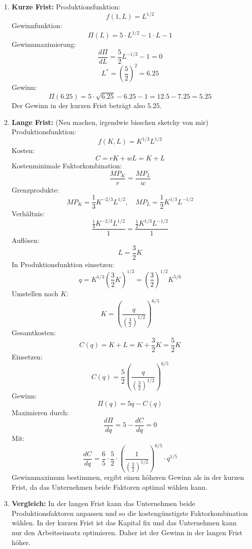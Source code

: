 \begin{solution}
	\begin{enumerate}
		\item \textbf{Kurze Frist:}
		      Produktionsfunktion:
		      \[
			      f(1, L) = L^{1/2}
		      \]
		      Gewinnfunktion:
		      \[
			      \Pi(L) = 5 \cdot L^{1/2} - 1 \cdot L - 1
		      \]
		      Gewinnmaximierung:
		      \[
			      \frac{d\Pi}{dL} = \frac{5}{2} L^{-1/2} - 1 = 0
		      \]
		      \[
			      L^* = \left(\frac{5}{2}\right)^2 = 6.25
		      \]
		      Gewinn:
		      \[
			      \Pi(6.25) = 5 \cdot \sqrt{6.25} - 6.25 - 1 = 12.5 - 7.25 = 5.25
		      \]
		      Der Gewinn in der kurzen Frist beträgt also \(\boxed{5.25}\).

		\item \textbf{Lange Frist:} (Neu machen, irgendwie bisschen sketchy von mir)
		      Produktionsfunktion:
		      \[
			      f(K, L) = K^{1/3} L^{1/2}
		      \]
		      Kosten:
		      \[
			      C = rK + wL = K + L
		      \]
		      Kostenminimale Faktorkombination:
		      \[
			      \frac{MP_K}{r} = \frac{MP_L}{w}
		      \]
		      Grenzprodukte:
		      \[
			      MP_K = \frac{1}{3} K^{-2/3} L^{1/2}, \quad MP_L = \frac{1}{2} K^{1/3} L^{-1/2}
		      \]
		      Verhältnis:
		      \[
			      \frac{\frac{1}{3} K^{-2/3} L^{1/2}}{1} = \frac{\frac{1}{2} K^{1/3} L^{-1/2}}{1}
		      \]
		      Auflösen:
		      \[
			      L = \frac{3}{2} K
		      \]
		      In Produktionsfunktion einsetzen:
		      \[
			      q = K^{1/3} \left(\frac{3}{2} K\right)^{1/2} = \left(\frac{3}{2}\right)^{1/2} K^{5/6}
		      \]
		      Umstellen nach \(K\):
		      \[
			      K = \left(\frac{q}{\left(\frac{3}{2}\right)^{1/2}}\right)^{6/5}
		      \]
		      Gesamtkosten:
		      \[
			      C(q) = K + L = K + \frac{3}{2} K = \frac{5}{2} K
		      \]
		      Einsetzen:
		      \[
			      C(q) = \frac{5}{2} \left(\frac{q}{\left(\frac{3}{2}\right)^{1/2}}\right)^{6/5}
		      \]
		      Gewinn:
		      \[
			      \Pi(q) = 5q - C(q)
		      \]
		      Maximieren durch:
		      \[
			      \frac{d\Pi}{dq} = 5 - \frac{dC}{dq} = 0
		      \]
		      Mit:
		      \[
			      \frac{dC}{dq} = \frac{6}{5} \cdot \frac{5}{2} \cdot \left(\frac{1}{\left(\frac{3}{2}\right)^{1/2}}\right)^{6/5} \cdot q^{1/5}
		      \]
		      Gewinnmaximum bestimmen, ergibt einen höheren Gewinn als in der kurzen Frist, da das Unternehmen beide Faktoren optimal wählen kann.

		\item \textbf{Vergleich:}
		      In der langen Frist kann das Unternehmen beide Produktionsfaktoren anpassen und so die kostengünstigste Faktorkombination wählen. In der kurzen Frist ist das Kapital fix und das Unternehmen kann nur den Arbeitseinsatz optimieren. Daher ist der Gewinn in der langen Frist höher.


\end{enumerate}
\end{solution}
